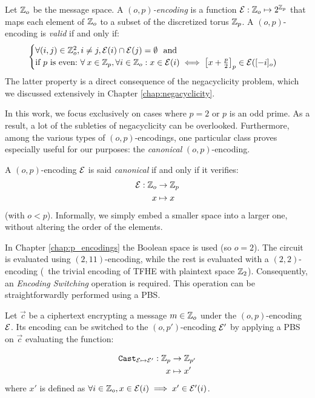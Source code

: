 \begin{definition}[$(o, p)$-encoding]
	Let $\mathbb{Z}_o$ be the message space. A \emph{$(o, p)$-encoding} is a function $\mathcal{E}: \mathbb{Z}_o \mapsto 2^{\mathbb{Z}_p}$ that maps each element of $\mathbb{Z}_o$ to a subset of the discretized torus $\mathbb{Z}_p$. A $(o, p)$-encoding is \emph{valid} if and only if:
	\begin{equation}
		\begin{cases}
			\forall (i, j) \in \mathbb{Z}_o^2, i \ne j, \mathcal{E}(i) \cap \mathcal{E}(j) = \emptyset~\text{ and}\\
			\text{if $p$ is even:} ~\forall \:x \in \mathbb Z_p, \forall i \in \mathbb{Z}_o: x \in \mathcal{E}(i) \iff \left [ x + \frac p 2 \right ]_p \in \mathcal{E}([-i]_o)
		\end{cases}
		\label{def:validity}
	\end{equation}
	The latter property is a direct consequence of the negacyclicity problem, which we discussed extensively in Chapter \ref{chap:negacyclicity}.
	\label{def:hippogryph_encoding}
\end{definition}

In this work, we focus exclusively on cases where $p=2$ or $p$ is an odd prime. As a result, a lot of the subleties of negacyclicity can be overlooked. Furthermore, among the various types of $(o, p)$-encodings, one particular class proves especially useful for our purposes: the \textit{canonical} $(o, p)$-encoding.

\begin{definition}
	\label{def:canonical-encoding}
	A $(o, p)$-encoding $\mathcal{E}$ is said \textit{canonical} if and only if it verifies: 
	\begin{align*}
		\mathcal{E}: \mathbb{Z}_o &\rightarrow \mathbb{Z}_p\\
		x &\mapsto x
	\end{align*}
	(with $o < p$). Informally, we simply embed a smaller space into a larger one, without altering the order of the elements.
\end{definition}


In Chapter \ref{chap:p_encodings} the Boolean space is used (so $o=2$). The \SubBytes circuit is evaluated using $(2,11)$-encoding, while the rest is evaluated with a $(2, 2)$-encoding (\ie~the trivial encoding of \gls{TFHE} with plaintext space $\mathbb{Z}_2$). Consequently, an \textit{Encoding Switching} operation is required. This operation can be straightforwardly performed using a \gls{PBS}.

\begin{definition}
	\label{def:encoding-switching}
	Let $\vec c$ be a ciphertext encrypting a message $m \in \mathbb{Z}_o$ under the $(o, p)$-encoding $\mathcal{E}$. Its encoding can be switched to the $(o, p')$-encoding $\mathcal{E}'$ by applying a \gls{PBS} on $\vec c$ evaluating the function:
	
	\begin{align*}
		\texttt{Cast}_{\mathcal{E} \mapsto \mathcal{E}'}: \mathbb{Z}_p &\rightarrow \mathbb{Z}_{p'}\\
		x &\mapsto x'
	\end{align*}
	where $x'$ is defined as $\forall i \in \mathbb{Z}_o, x \in \mathcal{E}(i) \implies x' \in \mathcal{E}'(i)$.
\end{definition}


